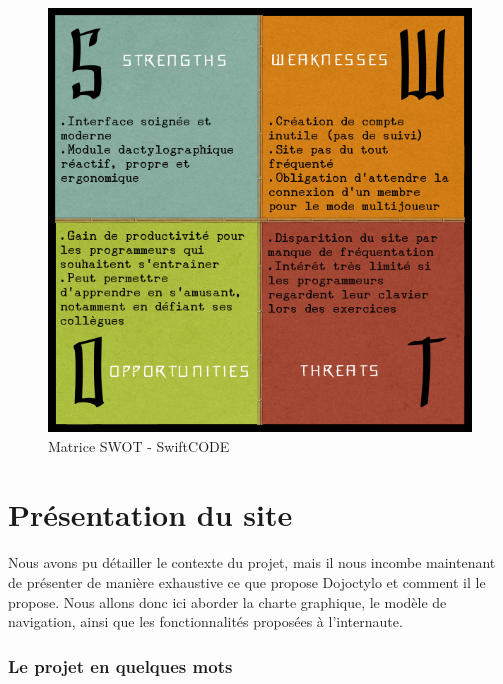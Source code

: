 \documentclass[a4paper,12pt]{article}
\begin{document}
\begin{figure}
\begin{center}
\includegraphics[scale=0.5]{swot-swiftcode.png}
\end{center}
\caption{Matrice SWOT - SwiftCODE}
\end{figure}

\newpage


\part{Présentation du site}

Nous avons pu détailler le contexte du projet, mais il nous incombe maintenant de présenter de manière exhaustive ce que propose Dojoctylo et comment il le propose. Nous allons donc ici aborder la charte graphique, le modèle de navigation, ainsi que les fonctionnalités proposées à l'internaute.

\section{Le projet en quelques mots}
\end{document}
